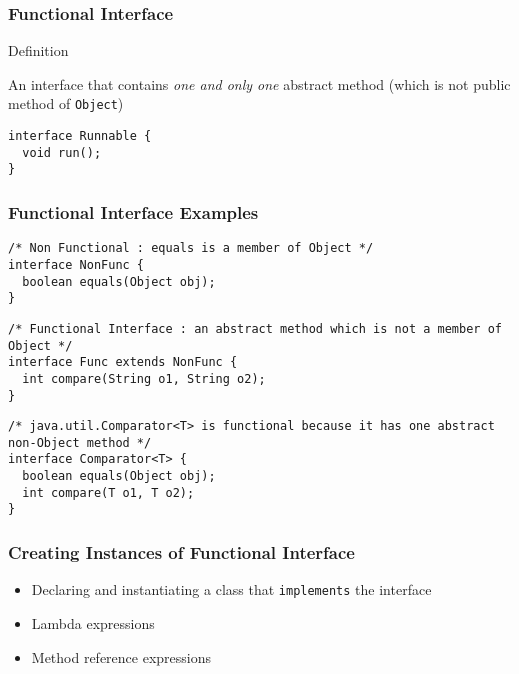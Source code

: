 \documentclass{beamer}
\begin{document}
\begin{frame}[fragile]
\frametitle{Functional Interface}

\begin{block} {Definition}
    
An interface that contains \textit{one and only one} abstract method
(which is not public method of \texttt{Object})
\end{block}
\pause
\begin{example}
    \begin{lstlisting}
interface Runnable {
  void run();
}
\end{lstlisting}
\end{example}

\end{frame}


\begin{frame}[fragile]
\frametitle{Functional Interface Examples}

\begin{example}
    \begin{lstlisting}
/* Non Functional : equals is a member of Object */    
interface NonFunc {
  boolean equals(Object obj);
}
\end{lstlisting}
\pause
\begin{lstlisting}
/* Functional Interface : an abstract method which is not a member of Object */
interface Func extends NonFunc {
  int compare(String o1, String o2);
}
\end{lstlisting}
\pause
\begin{lstlisting}
/* java.util.Comparator<T> is functional because it has one abstract non-Object method */
interface Comparator<T> {
  boolean equals(Object obj);
  int compare(T o1, T o2);
}

\end{lstlisting}
\end{example}
\end{frame}


\begin{frame}[fragile]
    \frametitle{Creating Instances of Functional Interface}
    \begin{itemize}
    \item<1-> Declaring and instantiating a class that \texttt{implements} the interface
    \item<2-> Lambda expressions
    \item<3-> Method reference expressions
    \end{itemize}
\end{frame}
\end{document}
